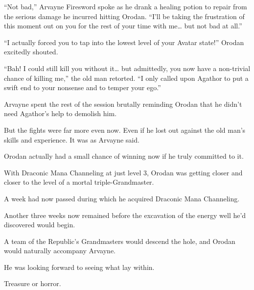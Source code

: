 \documentclass[a4paper,10pt]{book}
\begin{document}
“Not bad,” Arvayne Firesword spoke as he drank a healing potion to repair from the serious damage he incurred hitting Orodan. “I’ll be taking the frustration of this moment out on you for the rest of your time with me… but not bad at all.”\par
“I actually forced you to tap into the lowest level of your Avatar state!” Orodan excitedly shouted.\par
“Bah! I could still kill you without it… but admittedly, you now have a non-trivial chance of killing me,” the old man retorted. “I only called upon Agathor to put a swift end to your nonsense and to temper your ego.”\par
Arvayne spent the rest of the session brutally reminding Orodan that he didn’t need Agathor’s help to demolish him.\par
But the fights were far more even now. Even if he lost out against the old man’s skills and experience. It was as Arvayne said.\par
Orodan actually had a small chance of winning now if he truly committed to it.\par
With Draconic Mana Channeling at just level 3, Orodan was getting closer and closer to the level of a mortal triple-Grandmaster.\par
A week had now passed during which he acquired Draconic Mana Channeling.\par
Another three weeks now remained before the excavation of the energy well he’d discovered would begin.\par
A team of the Republic’s Grandmasters would descend the hole, and Orodan would naturally accompany Arvayne.\par
He was looking forward to seeing what lay within.\par
Treasure or horror.\par
\end{document}
